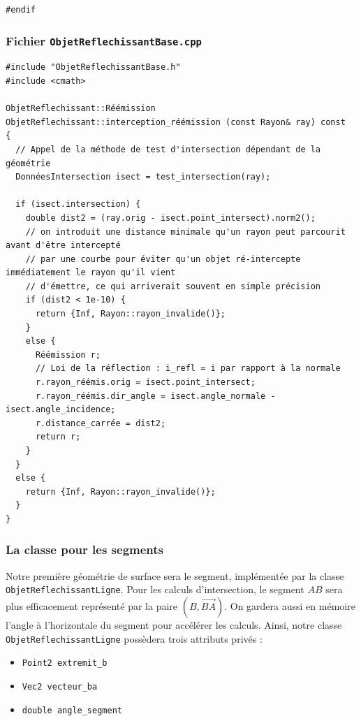 \documentclass{book}
\newcommand{\inline}[1]{\texttt{#1}}
\def\filename{\texttt}
\begin{document}
\begin{correction}
\begin{verbatim}
#endif
\end{verbatim}

\subsubsection*{Fichier \filename{ObjetReflechissantBase.cpp}}

\begin{verbatim}
#include "ObjetReflechissantBase.h"
#include <cmath>

ObjetReflechissant::Réémission ObjetReflechissant::interception_réémission (const Rayon& ray) const
{
  // Appel de la méthode de test d'intersection dépendant de la géométrie
  DonnéesIntersection isect = test_intersection(ray);

  if (isect.intersection) {
    double dist2 = (ray.orig - isect.point_intersect).norm2();
    // on introduit une distance minimale qu'un rayon peut parcourit avant d'être intercepté
    // par une courbe pour éviter qu'un objet ré-intercepte immédiatement le rayon qu'il vient
    // d'émettre, ce qui arriverait souvent en simple précision
    if (dist2 < 1e-10) {
      return {Inf, Rayon::rayon_invalide()};
    }
    else {
      Réémission r;
      // Loi de la réflection : i_refl = i par rapport à la normale
      r.rayon_réémis.orig = isect.point_intersect;
      r.rayon_réémis.dir_angle = isect.angle_normale - isect.angle_incidence;
      r.distance_carrée = dist2;
      return r;
    }
  }
  else {
    return {Inf, Rayon::rayon_invalide()};
  }
}
\end{verbatim}

\end{correction}

\subsubsection{La classe pour les segments}

Notre première géométrie de surface sera le segment, implémentée par la classe \inline{ObjetReflechissantLigne}. Pour les calculs d'intersection, le segment $AB$ sera plus efficacement représenté par la paire $(B,\vec{BA})$. On gardera aussi en mémoire l'angle à l'horizontale du segment pour accélérer les calculs. Ainsi, notre classe \inline{ObjetReflechissantLigne} possèdera trois attributs privés :
\begin{itemize}
  \item \inline{Point2 extremit_b}
  \item \inline{Vec2 vecteur_ba}
  \item \inline{double angle_segment}
\end{itemize}
\end{document}
